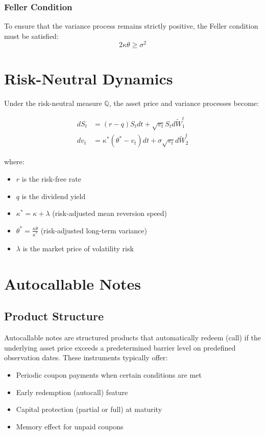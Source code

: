 \documentclass[12pt,a4paper]{article}
\begin{document}
\subsubsection{Feller Condition}
To ensure that the variance process remains strictly positive, the Feller condition must be satisfied:
\begin{equation}
2\kappa\theta \geq \sigma^2
\end{equation}

\section{Risk-Neutral Dynamics}

Under the risk-neutral measure $\mathbb{Q}$, the asset price and variance processes become:

\begin{align}
dS_t &= (r - q) S_t dt + \sqrt{v_t} S_t d\tilde{W}_1^t \\
dv_t &= \kappa^*(\theta^* - v_t)dt + \sigma\sqrt{v_t} d\tilde{W}_2^t
\end{align}

where:
\begin{itemize}
    \item $r$ is the risk-free rate
    \item $q$ is the dividend yield
    \item $\kappa^* = \kappa + \lambda$ (risk-adjusted mean reversion speed)
    \item $\theta^* = \frac{\kappa\theta}{\kappa^*}$ (risk-adjusted long-term variance)
    \item $\lambda$ is the market price of volatility risk
\end{itemize}

\section{Autocallable Notes}

\subsection{Product Structure}

Autocallable notes are structured products that automatically redeem (call) if the underlying asset price exceeds a predetermined barrier level on predefined observation dates. These instruments typically offer:

\begin{itemize}
    \item Periodic coupon payments when certain conditions are met
    \item Early redemption (autocall) feature
    \item Capital protection (partial or full) at maturity
    \item Memory effect for unpaid coupons
\end{itemize}
\end{document}
